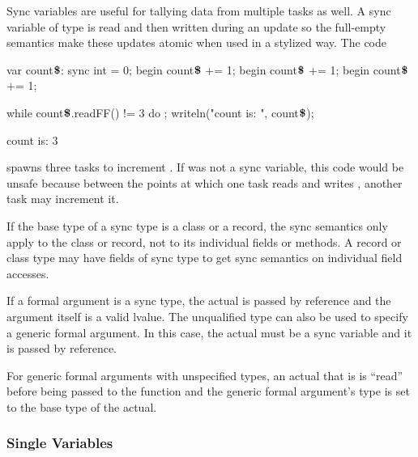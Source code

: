 \begin{example}
Sync variables are useful for tallying data from multiple tasks as
well.  A sync variable of type  is read and then written
during an update so the full-empty semantics make these updates atomic
when used in a stylized way.  The code
\begin{chapelpre}
\end{chapelpre}
\begin{chapel}
var count$\mbox{{\bf \$}}$: sync int = 0;
begin count$\mbox{{\bf \$}}$ += 1;
begin count$\mbox{{\bf \$}}$ += 1;
begin count$\mbox{{\bf \$}}$ += 1;
\end{chapel}
\begin{chapelpost}
while count$\mbox{{\bf \$}}$.readFF() != 3 do ;
writeln("count is: ", count$\mbox{{\bf \$}}$);
\end{chapelpost}
\begin{chapeloutput}
count is: 3
\end{chapeloutput}
spawns three tasks to increment .
If  was not a sync variable, this code
would be unsafe because between the points at which one task
reads  and
writes , another task may increment it.
\end{example}

If the base type of a sync type is a class or a record, the sync
semantics only apply to the class or record, not to its individual
fields or methods.  A record or class type may have fields of sync
type to get sync semantics on individual field accesses.

If a formal argument is a sync type, the actual is passed by reference
and the argument itself is a valid lvalue.  The unqualified
type  can also be used to specify a generic formal
argument.  In this case, the actual must be a sync variable and it is
passed by reference.

For generic formal arguments with unspecified types, an actual that
is  is ``read'' before being passed to the function and the
generic formal argument's type is set to the base type of the actual.

\subsubsection{Single Variables}
\label{Single_Variables}

